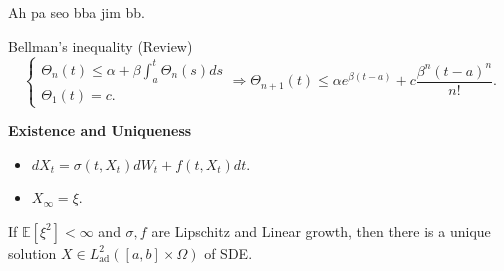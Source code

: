 \documentclass[12pt]{report}
\newcommand{\E}{\mathbb{E}}
\renewcommand{\1}{\mathbb{1}}
\renewcommand{\O}{\Omega}
\theoremstyle{break}
\theoremstyle{newdef}
\theoremstyle{remark}
\begin{document}
Ah pa seo bba jim bb.

Bellman's inequality (Review)
$$
\begin{cases}
\Theta_n(t) \leq \alpha + \beta \int_a^t \Theta_n(s)ds\\
\Theta_1(t) = c.
\end{cases}
\Rightarrow \Theta_{n+1}(t) \leq \alpha e^{\beta(t-a)} + c \frac{\beta^n (t-a)^n}{n!}.
$$



\textbf{Existence and Uniqueness}
\begin{itemize}
\item $dX_t = \sigma(t, X_t)dW_t + f(t,X_t)dt$.
\item $X_\infty = \xi$.
\end{itemize}

If $\E[\xi^2] < \infty$ and $\sigma, f$ are Lipschitz and Linear growth, then
there is a unique solution $X \in L^2_{\text{ad}}([a,b]\times \O)$ of SDE.
\end{document}
